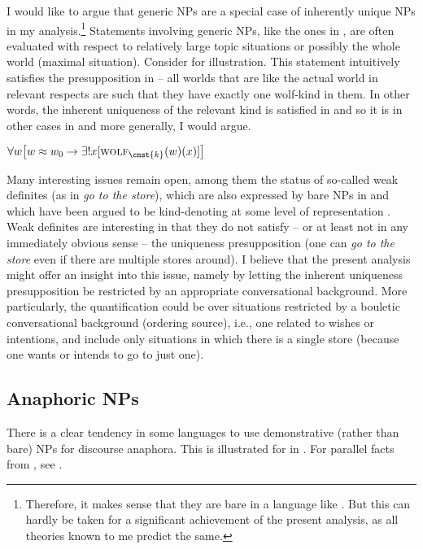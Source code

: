 \documentclass[output=paper,colorlinks,citecolor=brown,newtxmath]{langscibook}
\begin{document}
\noindent I would like to argue that generic NPs are a special case of inherently unique NPs in my analysis.\footnote{Therefore, it makes sense that they are bare in a language like . But this can hardly be taken for a significant achievement of the present analysis, as all theories known to me predict the same.} Statements involving generic NPs, like the ones in , are often evaluated with respect to relatively large topic situations or possibly the whole world (maximal situation). Consider  for illustration. This statement intuitively satisfies the presupposition in  -- all worlds that are like the actual world in relevant respects are such that they have exactly one wolf-kind in them. In other words, the inherent uniqueness of the relevant kind is satisfied in  and so it is in other cases in  and more generally, I would argue.

\ea $\forall w\big[w\approx w_0\rightarrow\exists!x[\textsc{wolf}_{\cnst{k}}(w)(x)]\big]$\label{simik:ex:wolf}
\z

\noindent Many interesting issues remain open, among them the status of so-called weak definites (as in \textit{go to the store}), which are also expressed by bare NPs in  and which have been argued to be kind-denoting at some level of representation \citep{Aguilar-Guevara.Zwarts2011}. Weak definites are interesting in that they do not satisfy -- or at least not in any immediately obvious sense -- the uniqueness presupposition (one can \textit{go to the store} even if there are multiple stores around). I believe that the present analysis might offer an insight into this issue, namely by letting the inherent uniqueness presupposition be restricted by an appropriate conversational background. More particularly, the quantification could be over situations restricted by a bouletic conversational background (ordering source), i.e., one related to wishes or intentions, and include only situations in which there is a single store (because one wants or intends to go to just one).

\subsection{Anaphoric NPs}

There is a clear tendency in some  languages to use demonstrative (rather than bare) NPs for discourse anaphora. This is illustrated for  in . For parallel facts from , see \citet{Arsenijevic2018}.
\end{document}
